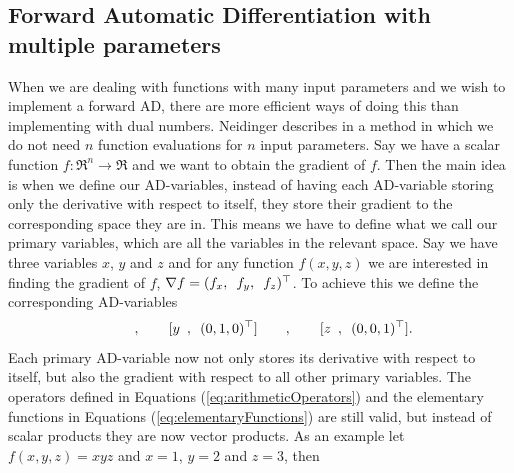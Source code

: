 \subsection{Forward Automatic Differentiation with multiple parameters}
When we are dealing with functions with many input parameters and we wish to implement a forward AD, there are more efficient ways of doing this than implementing with dual numbers. Neidinger describes in \emph{\citet{doi:10.1137/080743627}} a method in which we do not need $n$ function evaluations for $n$ input parameters. Say we have a scalar function $f: \Re^n \rightarrow \Re$ and we want to obtain the gradient of $f$. Then the main idea is when we define our AD-variables, instead of having each AD-variable storing only the derivative with respect to itself, they store their gradient to the corresponding space they are in. This means we have to define what we call our primary variables, which are all the variables in the relevant space. Say we have three variables $x$, $y$ and $z$ and for any function $f(x,y,z)$ we are interested in finding the gradient of $f$, $\nabla f=(f_x,\hspace{0.5em} f_y,\hspace{0.5em} f_z)^\top$. To achieve this we define the corresponding AD-variables
\begin{equation*}
    [x\hspace{0.5em},\hspace{0.5em}(1,0,0)^\top]\hspace{2em},\hspace{2em}
    [y\hspace{0.5em},\hspace{0.5em}(0,1,0)^\top]\hspace{2em},\hspace{2em}
    [z\hspace{0.5em},\hspace{0.5em}(0,0,1)^\top].
\end{equation*}
Each primary AD-variable now not only stores its derivative with respect to itself, but also the gradient with respect to all other primary variables. The operators defined in Equations (\ref{eq:arithmeticOperators}) and the elementary functions in Equations (\ref{eq:elementaryFunctions}) are still valid, but instead of scalar products they are now vector products. As an example let $f(x,y,z) = xyz$ and $x = 1$, $y = 2$ and $z = 3$, then
